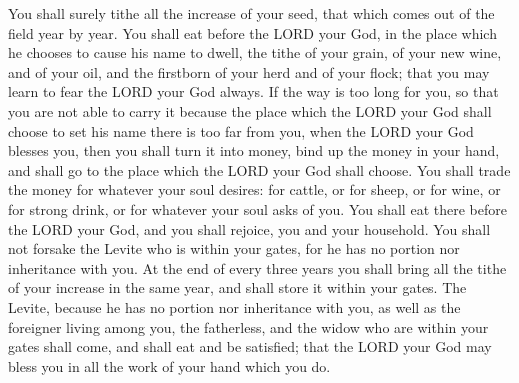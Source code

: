 \myverse{}You shall surely tithe all the increase of your seed, that which
comes out of the field year by year.
\myverse{}You shall eat before the LORD your God, in the place which he chooses to
cause his name to dwell, the tithe of your grain, of your new wine, and of your oil, and the firstborn
of your herd and of your flock; that you may learn to fear the LORD your God always.
\myverse{}If the way is too long for you, so that you are not able to carry it because
the place which the LORD your God shall choose to set his name there is too far from you, when the LORD
your God blesses you,
\myverse{}then you shall turn it into money, bind up the money in your hand, and shall
go to the place which the LORD your God shall choose.
\myverse{}You shall trade the money for whatever your soul desires: for cattle, or
for sheep, or for wine, or for strong drink, or for whatever your soul asks of you. You shall eat there
before the LORD your God, and you shall rejoice, you and your household.
\myverse{}You shall not forsake the Levite who is within your gates, for he has no
portion nor inheritance with you.
\myverse{}At the end of every three years you shall bring all the tithe of your increase
in the same year, and shall store it within your gates.
\myverse{}The Levite, because he has no portion nor inheritance with you, as well as
the foreigner living among you, the fatherless, and the widow who are within your gates shall come, and
shall eat and be satisfied; that the LORD your God may bless you in all the work of your hand which you
do.


